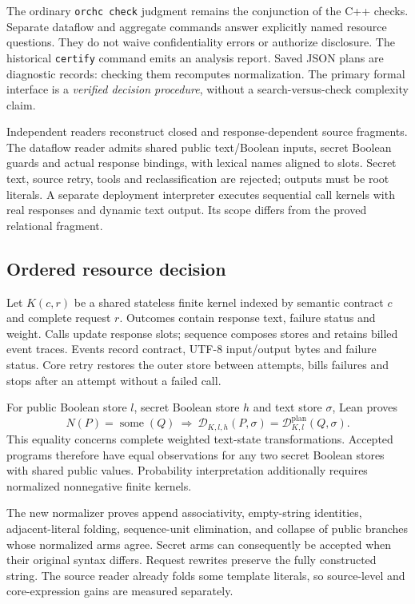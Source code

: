 \documentclass[preprint,12pt,a4paper]{elsarticle}
\begin{document}
The ordinary \texttt{orchc check} judgment remains the conjunction of the C++
checks. Separate dataflow and aggregate commands answer explicitly named
resource questions. They do not waive confidentiality errors or authorize
disclosure. The historical \texttt{certify} command emits an analysis report.
Saved JSON plans are diagnostic records: checking them recomputes normalization.
The primary formal interface is a \emph{verified decision procedure}, without
a search-versus-check complexity claim.

Independent readers reconstruct closed and response-dependent source fragments.
The dataflow reader admits shared public text/Boolean inputs, secret Boolean
guards and actual response bindings, with lexical names aligned to slots.
Secret text, source retry, tools and reclassification are rejected; outputs
must be root literals. A separate deployment interpreter executes sequential
call kernels with real responses and dynamic text output. Its scope differs
from the proved relational fragment.

\subsection{Ordered resource decision}
Let $K(c,r)$ be a shared stateless finite kernel indexed by semantic contract
$c$ and complete request $r$. Outcomes contain response text, failure status
and weight. Calls update response slots; sequence composes stores and retains
billed event traces. Events record contract, UTF-8 input/output bytes and
failure status. Core retry restores the outer store between attempts, bills
failures and stops after an attempt without a failed call.

For public Boolean store $l$, secret Boolean store $h$ and text store $\sigma$,
Lean proves
\[
 N(P)=\operatorname{some}(Q)
 \ \Longrightarrow\
 \mathcal{D}_{K,l,h}(P,\sigma)
 =\mathcal{D}^{\mathrm{plan}}_{K,l}(Q,\sigma).
\]
This equality concerns complete weighted text-state transformations.
Accepted programs therefore have equal observations for any two secret
Boolean stores with shared public values. Probability interpretation
additionally requires normalized nonnegative finite kernels.

The new normalizer proves append associativity, empty-string identities,
adjacent-literal folding, sequence-unit elimination, and collapse of public
branches whose normalized arms agree. Secret arms can consequently be
accepted when their original syntax differs. Request rewrites preserve the
fully constructed string. The source reader already folds some template
literals, so source-level and core-expression gains are measured separately.
\end{document}
